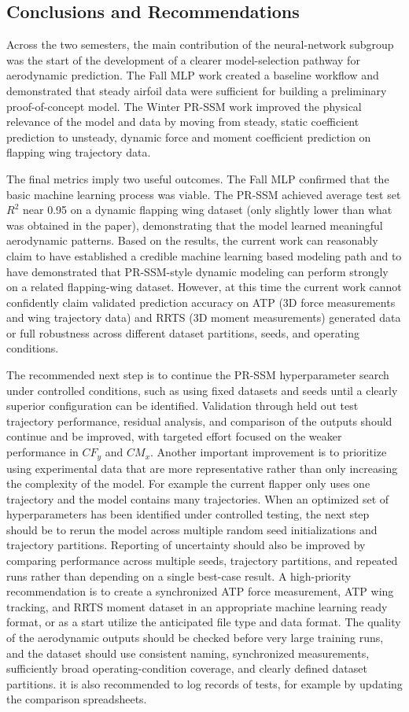 \subsection{Conclusions and Recommendations}
Across the two semesters, the main contribution of the neural-network subgroup was the start of the development of a clearer model-selection pathway for aerodynamic prediction. The Fall MLP work created a baseline workflow and demonstrated that steady airfoil data were sufficient for building a preliminary proof-of-concept model. The Winter PR-SSM work improved the physical relevance of the model and data by moving from steady, static coefficient prediction to unsteady, dynamic force and moment coefficient prediction on flapping wing trajectory data.

The final metrics imply two useful outcomes. The Fall MLP confirmed that the basic machine learning process was viable. The PR-SSM achieved average test set $R^2$ near 0.95 on a dynamic flapping wing dataset (only slightly lower than what was obtained in the paper), demonstrating that the model learned meaningful aerodynamic patterns. Based on the results, the current work can reasonably claim to have established a credible machine learning based modeling path and to have demonstrated that PR-SSM-style dynamic modeling can perform strongly on a related flapping-wing dataset. However, at this time the current work cannot confidently claim validated prediction accuracy on ATP (3D force measurements and wing  trajectory data) and RRTS (3D moment measurements) generated data or full robustness across different dataset partitions, seeds, and operating conditions.

The recommended next step is to continue the PR-SSM hyperparameter search under controlled conditions, such as using fixed datasets and seeds until a clearly superior configuration can be identified. Validation through held out test trajectory performance, residual analysis, and comparison of the outputs should continue and be improved, with targeted effort focused on the weaker performance in $CF_y$ and $CM_x$. Another important improvement is to prioritize using experimental data that are more representative rather than only increasing the complexity of the model. For example the current flapper only uses one trajectory and the model contains many trajectories. When an optimized set of hyperparameters has been identified under controlled testing, the next step should be to rerun the model across multiple random seed initializations and trajectory partitions. Reporting of uncertainty should also be improved by comparing performance across multiple seeds, trajectory partitions, and repeated runs rather than depending on a single best-case result. A high-priority recommendation is to create a synchronized ATP force measurement, ATP wing tracking, and RRTS moment dataset in an appropriate machine learning ready format, or as a start utilize the anticipated file type and data format. The quality of the aerodynamic outputs should be checked before very large training runs, and the dataset should use consistent naming, synchronized measurements, sufficiently broad operating-condition coverage, and clearly defined dataset partitions. it is also recommended to log records of tests, for example by updating the comparison spreadsheets.
